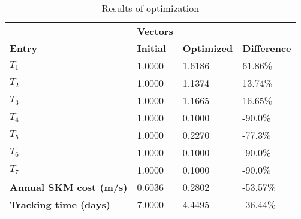 \begin{table}[H]
\centering
\begin{tabular}{llll}
\textbf{}      & \cellcolor[HTML]{EFEFEF}\textbf{Vectors} & \textbf{} & \textbf{}         \\
\rowcolor[HTML]{EFEFEF} 
\textbf{Entry} & \textbf{Initial} & \textbf{Optimized} & \textbf{Difference} \\
$T_1$ & 1.0000 & 1.6186 & 61.86\% \\ 
$T_2$ & 1.0000 & 1.1374 & 13.74\% \\ 
$T_3$ & 1.0000 & 1.1665 & 16.65\% \\ 
$T_4$ & 1.0000 & 0.1000 & -90.0\% \\ 
$T_5$ & 1.0000 & 0.2270 & -77.3\% \\ 
$T_6$ & 1.0000 & 0.1000 & -90.0\% \\ 
$T_7$ & 1.0000 & 0.1000 & -90.0\% \\ 
\rowcolor[HTML]{EFEFEF} 
\textbf{Annual SKM cost (m/s)}  & 0.6036 & 0.2802 & -53.57\% \\ 
\rowcolor[HTML]{EFEFEF} 
\textbf{Tracking time (days)}  & 7.0000 & 4.4495 & -36.44\% \\ 
\end{tabular}
\caption{Results of optimization}
\label{tab:OptimizationAnalysis}
\end{table}